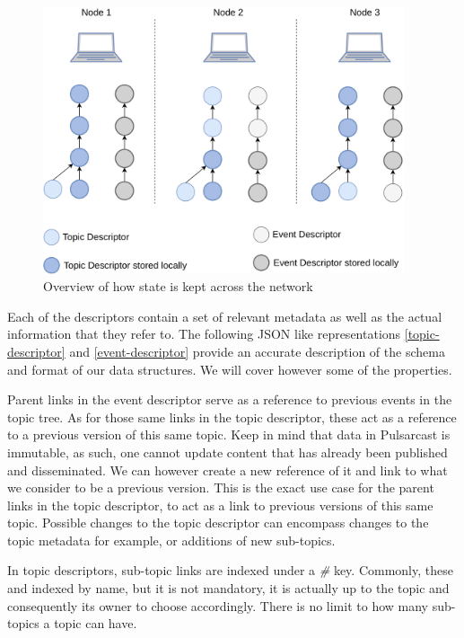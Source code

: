 \begin{figure}[hb!]
  \centering
  \includegraphics[width=0.95\textwidth]{img/pulsarcast-local-vs-distributed-state.png}
  \caption{Overview of how state is kept across the network}
  \label{fig:pulsarcast-local-vs-distributed-state}
\end{figure}

Each of the descriptors contain a set of relevant metadata as well as the
actual information that they refer to. The following JSON like representations
\ref{topic-descriptor} and \ref{event-descriptor} provide an accurate
description of the schema and format of our data structures. We will cover
however some of the properties.

Parent links in the event descriptor serve as a reference to previous events in
the topic tree.  As for those same links in the topic descriptor, these act as
a reference to a previous version of this same topic. Keep in mind that data in
Pulsarcast is immutable, as such, one cannot update content that has already
been published and disseminated. We can however create a new reference of it
and link to what we consider to be a previous version. This is the exact use
case for the parent links in the topic descriptor, to act as a link to previous
versions of this same topic. Possible changes to the topic descriptor can
encompass changes to the topic metadata for example, or additions of new
sub-topics.

In topic descriptors, sub-topic links are indexed under a \emph{\#} key.
Commonly, these and indexed by name, but it is not mandatory, it is actually up
to the topic and consequently its owner to choose accordingly.  There is no
limit to how many sub-topics a topic can have.

